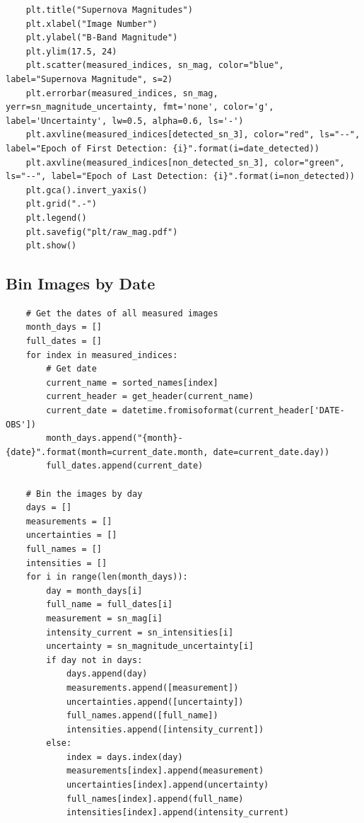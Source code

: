 \documentclass{article}
\begin{document}
\begin{appendices}
\begin{verbatim}
    plt.title("Supernova Magnitudes")
    plt.xlabel("Image Number")
    plt.ylabel("B-Band Magnitude")
    plt.ylim(17.5, 24)
    plt.scatter(measured_indices, sn_mag, color="blue", label="Supernova Magnitude", s=2)
    plt.errorbar(measured_indices, sn_mag, yerr=sn_magnitude_uncertainty, fmt='none', color='g', label='Uncertainty', lw=0.5, alpha=0.6, ls='-')
    plt.axvline(measured_indices[detected_sn_3], color="red", ls="--", label="Epoch of First Detection: {i}".format(i=date_detected))
    plt.axvline(measured_indices[non_detected_sn_3], color="green", ls="--", label="Epoch of Last Detection: {i}".format(i=non_detected))
    plt.gca().invert_yaxis()
    plt.grid(".-")
    plt.legend()
    plt.savefig("plt/raw_mag.pdf")
    plt.show()
\end{verbatim}

\subsection{Bin Images by Date}
\begin{verbatim}
    # Get the dates of all measured images
    month_days = []
    full_dates = []
    for index in measured_indices:
        # Get date
        current_name = sorted_names[index]
        current_header = get_header(current_name)
        current_date = datetime.fromisoformat(current_header['DATE-OBS'])
        month_days.append("{month}-{date}".format(month=current_date.month, date=current_date.day))
        full_dates.append(current_date)
    
    # Bin the images by day
    days = []
    measurements = []
    uncertainties = []
    full_names = []
    intensities = []
    for i in range(len(month_days)):
        day = month_days[i]
        full_name = full_dates[i]
        measurement = sn_mag[i]
        intensity_current = sn_intensities[i]
        uncertainty = sn_magnitude_uncertainty[i]
        if day not in days:
            days.append(day)
            measurements.append([measurement])
            uncertainties.append([uncertainty])
            full_names.append([full_name])
            intensities.append([intensity_current])
        else:
            index = days.index(day)
            measurements[index].append(measurement)
            uncertainties[index].append(uncertainty)
            full_names[index].append(full_name)
            intensities[index].append(intensity_current)
    

\end{verbatim}
\end{appendices}
\end{document}
